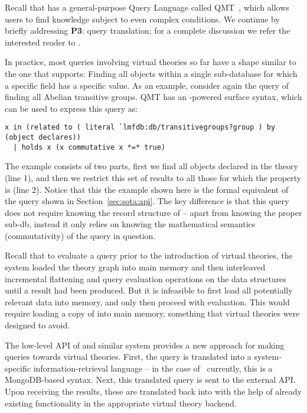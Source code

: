 Recall that \mmt has a general-purpose Query Language called QMT~\cite{Rabe:qlfml12}, which allows users to find knowledge subject to even complex conditions. 
We continue by briefly addressing \textbf{P3}: query translation; for a complete discussion we refer the interested reader to \cite{twiesing:msc17}. 

In practice, most queries involving virtual theories so far have a shape similar to the one that \lmfdb supports: 
Finding all objects within a single sub-database for which a specific field has a specific value. 
As an example, consider again the query of finding all Abelian transitive groups. 
QMT has an \mmt-powered surface syntax, which can be used to express this query as:
\begin{lstlisting}[language=qmt,basicstyle=\small\sf]
x in (related to ( literal `lmfdb:db/transitivegroups?group ) by (object declares)) 
  | holds x (x commutative x *=* true)
\end{lstlisting}

The example consists of two parts, first we find all objects declared in the  theory (line 1), and then we restrict this set of results to all those for which the  property is  (line 2). 
Notice that this the example shown here is the formal equivalent of the \lmfdb query shown in Section~\ref{sec:sota:api}. 
The key difference is that this query does not require knowing the record structure of \lmfdb --
apart from knowing the proper sub-db, instead it only relies on knowing the mathematical
semantics (commutativity) of the query in question. 

Recall that to evaluate a query prior to the introduction of virtual theories, the \mmt system loaded the theory graph into main memory and then interleaved incremental flattening and query evaluation operations on the \mmt data structures until a result had been produced. 
But it is infeasible to first load all potentially relevant data into memory, and only then proceed with evaluation. 
This would require loading a copy of \lmfdb into main memory, something that virtual theories were designed to avoid. 

The low-level API of  \lmfdb and similar system provides a new approach for making queries towards virtual theories. 
First, the \mmt query is translated into a system-specific information-retrieval language -- in the case of \lmfdb\ currently, this is a MongoDB-based syntax.
Next, this translated query is sent to the external API. 
Upon receiving the results, these are translated back into \ommt with the help of already existing functionality in the appropriate virtual theory backend.

